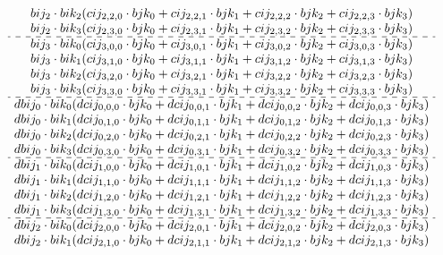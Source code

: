 \documentclass[12pt]{article}
\begin{document}
{$${\begin{array}{c}
bij_2 \cdot bik_2 (cij_{2,2,0} \cdot bjk_0 + cij_{2,2,1} \cdot bjk_1 + cij_{2,2,2} \cdot bjk_2 + cij_{2,2,3} \cdot bjk_3)\\
bij_2 \cdot bik_3 (cij_{2,3,0} \cdot bjk_0 + cij_{2,3,1} \cdot bjk_1 + cij_{2,3,2} \cdot bjk_2 + cij_{2,3,3} \cdot bjk_3)\\
\hdashline
bij_3 \cdot bik_0 (cij_{3,0,0} \cdot bjk_0 + cij_{3,0,1} \cdot bjk_1 + cij_{3,0,2} \cdot bjk_2 + cij_{3,0,3} \cdot bjk_3)\\
bij_3 \cdot bik_1 (cij_{3,1,0} \cdot bjk_0 + cij_{3,1,1} \cdot bjk_1 + cij_{3,1,2} \cdot bjk_2 + cij_{3,1,3} \cdot bjk_3)\\
bij_3 \cdot bik_2 (cij_{3,2,0} \cdot bjk_0 + cij_{3,2,1} \cdot bjk_1 + cij_{3,2,2} \cdot bjk_2 + cij_{3,2,3} \cdot bjk_3)\\
bij_3 \cdot bik_3 (cij_{3,3,0} \cdot bjk_0 + cij_{3,3,1} \cdot bjk_1 + cij_{3,3,2} \cdot bjk_2 + cij_{3,3,3} \cdot bjk_3)\\
\hdashline
dbij_0 \cdot bik_0 (dcij_{0,0,0} \cdot bjk_0 + dcij_{0,0,1} \cdot bjk_1 + dcij_{0,0,2} \cdot bjk_2 + dcij_{0,0,3} \cdot bjk_3)\\
dbij_0 \cdot bik_1 (dcij_{0,1,0} \cdot bjk_0 + dcij_{0,1,1} \cdot bjk_1 + dcij_{0,1,2} \cdot bjk_2 + dcij_{0,1,3} \cdot bjk_3)\\
dbij_0 \cdot bik_2 (dcij_{0,2,0} \cdot bjk_0 + dcij_{0,2,1} \cdot bjk_1 + dcij_{0,2,2} \cdot bjk_2 + dcij_{0,2,3} \cdot bjk_3)\\
dbij_0 \cdot bik_3 (dcij_{0,3,0} \cdot bjk_0 + dcij_{0,3,1} \cdot bjk_1 + dcij_{0,3,2} \cdot bjk_2 + dcij_{0,3,3} \cdot bjk_3)\\
\hdashline
dbij_1 \cdot bik_0 (dcij_{1,0,0} \cdot bjk_0 + dcij_{1,0,1} \cdot bjk_1 + dcij_{1,0,2} \cdot bjk_2 + dcij_{1,0,3} \cdot bjk_3)\\
dbij_1 \cdot bik_1 (dcij_{1,1,0} \cdot bjk_0 + dcij_{1,1,1} \cdot bjk_1 + dcij_{1,1,2} \cdot bjk_2 + dcij_{1,1,3} \cdot bjk_3)\\
dbij_1 \cdot bik_2 (dcij_{1,2,0} \cdot bjk_0 + dcij_{1,2,1} \cdot bjk_1 + dcij_{1,2,2} \cdot bjk_2 + dcij_{1,2,3} \cdot bjk_3)\\
dbij_1 \cdot bik_3 (dcij_{1,3,0} \cdot bjk_0 + dcij_{1,3,1} \cdot bjk_1 + dcij_{1,3,2} \cdot bjk_2 + dcij_{1,3,3} \cdot bjk_3)\\
\hdashline
dbij_2 \cdot bik_0 (dcij_{2,0,0} \cdot bjk_0 + dcij_{2,0,1} \cdot bjk_1 + dcij_{2,0,2} \cdot bjk_2 + dcij_{2,0,3} \cdot bjk_3)\\
dbij_2 \cdot bik_1 (dcij_{2,1,0} \cdot bjk_0 + dcij_{2,1,1} \cdot bjk_1 + dcij_{2,1,2} \cdot bjk_2 + dcij_{2,1,3} \cdot bjk_3)\\

\end{array}}$$}
\end{document}
